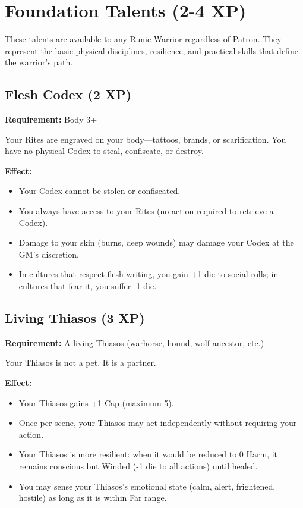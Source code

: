 \section{Foundation Talents (2-4 XP)}

These talents are available to any Runic Warrior regardless of Patron. They represent the basic physical disciplines, resilience, and practical skills that define the warrior's path.

\subsection{Flesh Codex (2 XP)}

\textbf{Requirement:} Body 3+

Your Rites are engraved on your body—tattoos, brands, or scarification. You have no physical Codex to steal, confiscate, or destroy.

\textbf{Effect:}
\begin{itemize}
\item Your Codex cannot be stolen or confiscated.
\item You always have access to your Rites (no action required to retrieve a Codex).
\item Damage to your skin (burns, deep wounds) may damage your Codex at the GM's discretion.
\item In cultures that respect flesh-writing, you gain +1 die to social rolls; in cultures that fear it, you suffer -1 die.
\end{itemize}

\subsection{Living Thiasos (3 XP)}

\textbf{Requirement:} A living Thiasos (warhorse, hound, wolf-ancestor, etc.)

Your Thiasos is not a pet. It is a partner.

\textbf{Effect:}
\begin{itemize}
\item Your Thiasos gains +1 Cap (maximum 5).
\item Once per scene, your Thiasos may act independently without requiring your action.
\item Your Thiasos is more resilient: when it would be reduced to 0 Harm, it remains conscious but Winded (-1 die to all actions) until healed.
\item You may sense your Thiasos's emotional state (calm, alert, frightened, hostile) as long as it is within Far range.
\end{itemize}

